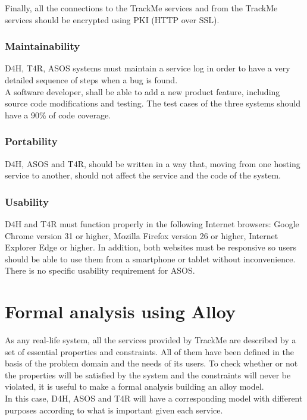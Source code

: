 \documentclass[a4paper, hidelinks, 12pt]{report}
\begin{document}
	Finally, all the connections to the TrackMe services and from the TrackMe services should be encrypted using PKI (HTTP over SSL).
	
	\subsection{Maintainability}
	D4H, T4R, ASOS systems must maintain a service log in order to have a very detailed sequence of steps when a bug is found.\\
	
	A software developer, shall be able to add a new product feature, including source code modifications and testing. The test cases of the three systems should have a 90\% of code coverage.\\
	
	\subsection{Portability}
	D4H, ASOS and T4R, should be written in a way that, moving from one hosting service to another, should not affect the service and the code of the system.
	
	\subsection{Usability}
	D4H and T4R must function properly in the following Internet browsers: Google Chrome version 31 or higher, Mozilla Firefox version 26 or higher, Internet Explorer Edge or higher. In addition, both websites must be responsive so users should be able to use them from a smartphone or tablet without inconvenience.\\
	
	There is no specific usability requirement for ASOS.
	
	\chapter{Formal analysis using Alloy}
	As any real-life system, all the services provided by TrackMe are described by a set of essential properties and constraints. All of them have been defined in the basis of the problem domain and the needs of its users. To check whether or not the properties will be satisfied by the system and the constraints will never be violated, it is useful to make a formal analysis building an alloy model.\\

In this case, D4H, ASOS and T4R will have a corresponding model with different purposes according to what is important given each service. 
\end{document}
